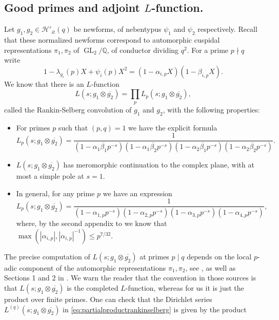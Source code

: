 \documentclass{article}
\theoremstyle{named}
\newcommand{\HH}{\mathcal{H}}
\newcommand{\Q}{\mathbb{Q}}
\DeclareMathOperator{\GL}{GL}
\begin{document}
\subsection{Good primes and adjoint $L$-function.}
Let $g_1, g_2 \in \HH'_{it}(q)$ be newforms, of nebentypus $\psi_1$ and $\psi_2$ respectively. Recall that these normalized newforms correspond to automorphic cuspidal representations $\pi_1, \pi_2$ of $\GL_2/\Q$, of conductor dividing $q^2$. For a prime $p \nmid q$ write
\begin{equation*}
1 - \lambda_{g_i}(p)X + \psi_i(p)X^2 = (1 - \alpha_{i, p}X)(1 - \beta_{i, p}X).
\end{equation*}
We know that there is an $L$-function 
\begin{equation*}
    L(s; g_1 \otimes \overline{g_2}) = \prod_p L_p(s; g_1 \otimes \overline{g_2}),
\end{equation*}
called the Rankin-Selberg convolution of $g_1$ and $g_2$, with the following properties:
\begin{itemize}
    \item  For primes $p$ such that $(p, q) = 1$ we have the explicit formula
\begin{equation*}
    L_p(s; g_1 \otimes \overline{g_2}) = \frac{1}{(1 - \alpha_1 \overline{\beta_1}p^{-s})(1 - \alpha_1 \overline{\beta_2}p^{-s})(1 - \alpha_2 \overline{\beta_1}p^{-s})(1 - \alpha_2 \overline{\beta_2}p^{-s})}.
\end{equation*}
    \item $L(s; g_1 \otimes \overline{g_2})$ has meromorphic continuation to the complex plane, with at most a simple pole at $s = 1$.
    \item In general, for any prime $p$ we have an expression 
\begin{equation*}
    L_p(s; g_1 \otimes \overline{g_2}) = \frac{1}{(1-\alpha_{1, p} p^{-s})(1-\alpha_{2, p} p^{-s})(1 - \alpha_{3, p} p^{-s})(1 - \alpha_{4, p} p^{-s})},
\end{equation*}
where, by the second appendix to \cite{kimramakrishnansarnak2003} we know that $\max(|\alpha_{i, p}|, |\alpha_{i, p}|^{-1}) \leq p^{7/32}$. 
\end{itemize} 
The precise computation of $L(s; g_1\otimes\overline{g_2})$ at primes $p \mid q$ depends on the local $p$-adic component of the automorphic representations $\pi_1, \pi_2$, see \cite{jacquetrankinselberg}, as well as Sections 1 and 2 in \cite{gelbartjacquetlift}. We warn the reader that the convention in those sources is that $L(s; g_1\otimes\overline{g_2})$ is the completed $L$-function, whereas for us it is just the product over finite primes. One can check that the Dirichlet series $L^{(q)}(s; g_1 \otimes \overline{g_2})$ in \eqref{eq:partialproductrankinselberg} is given by the product 
\end{document}
